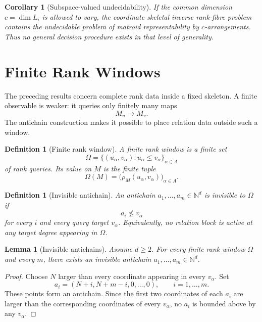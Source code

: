 \documentclass[11pt]{article}
\newtheorem{lemma}[theorem]{Lemma}
\newtheorem{corollary}[theorem]{Corollary}
\newtheorem{definition}[theorem]{Definition}
\begin{document}
\begin{corollary}[Subspace-valued undecidability]
If the common dimension \(c=\dim L_i\) is allowed to vary, the coordinate skeletal inverse rank-fibre problem contains the undecidable problem of matroid representability by \(c\)-arrangements. Thus no general decision procedure exists in that level of generality.
\end{corollary}

\section{Finite Rank Windows}

The preceding results concern complete rank data inside a fixed skeleton. A finite observable is weaker: it queries only finitely many maps
\[
M_u\longrightarrow M_v.
\]
The antichain construction makes it possible to place relation data outside such a window.

\begin{definition}[Finite rank window]
A finite rank window is a finite set
\[
\Omega=\{(u_\alpha,v_\alpha):u_\alpha\le v_\alpha\}_{\alpha\in A}
\]
of rank queries. Its value on \(M\) is the finite tuple
\[
\Omega(M)=\big(\rho_M(u_\alpha,v_\alpha)\big)_{\alpha\in A}.
\]
\end{definition}

\begin{definition}[Invisible antichain]
An antichain \(a_1,\ldots,a_m\in\mathbb N^d\) is invisible to \(\Omega\) if
\[
a_i\not\le v_\alpha
\]
for every \(i\) and every query target \(v_\alpha\). Equivalently, no relation block is active at any target degree appearing in \(\Omega\).
\end{definition}

\begin{lemma}[Invisible antichains]
Assume \(d\ge2\). For every finite rank window \(\Omega\) and every \(m\), there exists an invisible antichain \(a_1,\ldots,a_m\in\mathbb N^d\).
\end{lemma}

\begin{proof}
Choose \(N\) larger than every coordinate appearing in every \(v_\alpha\). Set
\[
a_i=(N+i,N+m-i,0,\ldots,0),
\qquad i=1,\ldots,m.
\]
These points form an antichain. Since the first two coordinates of each \(a_i\) are larger than the corresponding coordinates of every \(v_\alpha\), no \(a_i\) is bounded above by any \(v_\alpha\).
\end{proof}
\end{document}
